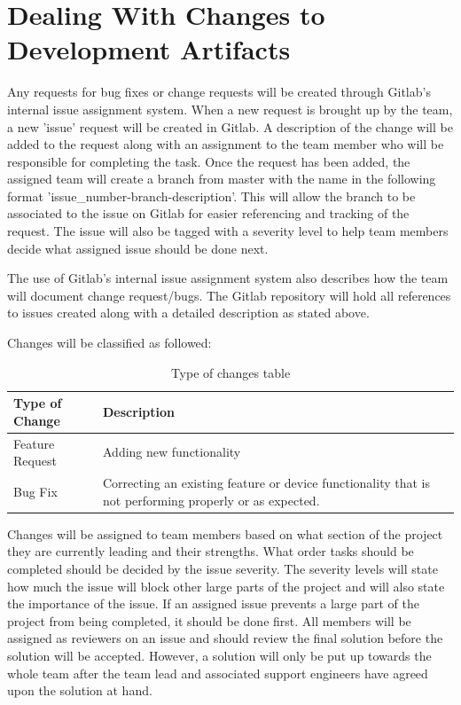 \documentclass[12pt,titlepage]{article}
\begin{document}
\section{Dealing With Changes to Development Artifacts}
Any requests for bug fixes or change requests will be created through Gitlab's internal issue assignment system. When a new request is brought up by the team, a new 'issue' request will be created in Gitlab. A description of the change will be added to the request along with an assignment to the team member who will be responsible for completing the task. Once the request has been added, the assigned team will create a branch from master with the name in the following format 'issue\_number-branch-description'. This will allow the branch to be associated to the issue on Gitlab for easier referencing and tracking of the request. The issue will also be tagged with a severity level to help team members decide what assigned issue should be done next.\par
The use of Gitlab's internal issue assignment system also describes how the team will document change request/bugs. The Gitlab repository will hold all references to issues created along with a detailed description as stated above.

Changes will be classified as followed:

\begin{table}[ht!]
\begin{center}
\begin{adjustbox}{max width=\textwidth}
\small
\begin{tabular}{|p{}|p{}|}
 \hline
 \textbf{Type of Change} & \textbf{Description} \\
 \hline
 Feature Request & Adding new functionality \\
 \hline
 Bug Fix & Correcting an existing feature or device functionality that is not performing properly or as expected. \\
 \hline
 
\end{tabular}
\end{adjustbox}
\end{center}
\caption{Type of changes table}
\end{table}

Changes will be assigned to team members based on what section of the project they are currently leading and their strengths. What order tasks should be completed should be decided by the issue severity. The severity levels will state how much the issue will block other large parts of the project and will also state the importance of the issue. If an assigned issue prevents a large part of the project from being completed, it should be done first.\newline
All members will be assigned as reviewers on an issue and should review the final solution before the solution will be accepted. However, a solution will only be put up towards the whole team after the team lead and associated support engineers have agreed upon the solution at hand. 
\end{document}
